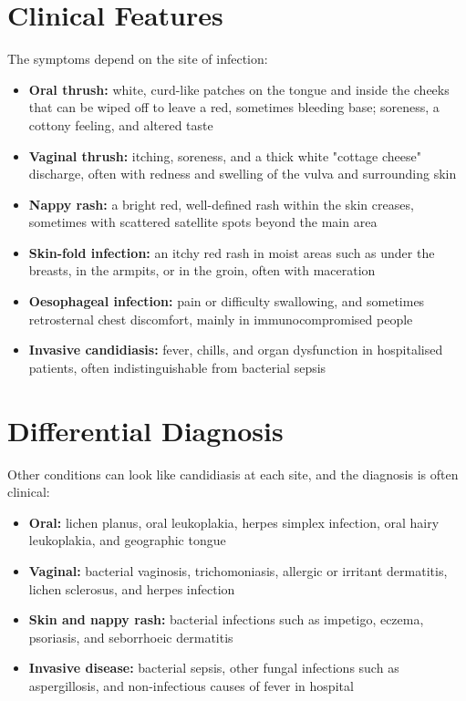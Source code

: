\section*{Clinical Features}
The symptoms depend on the site of infection:
\begin{itemize}
    \item \textbf{Oral thrush:} white, curd-like patches on the tongue and inside the cheeks that can be wiped off to leave a red, sometimes bleeding base; soreness, a cottony feeling, and altered taste
    \item \textbf{Vaginal thrush:} itching, soreness, and a thick white "cottage cheese" discharge, often with redness and swelling of the vulva and surrounding skin
    \item \textbf{Nappy rash:} a bright red, well-defined rash within the skin creases, sometimes with scattered satellite spots beyond the main area
    \item \textbf{Skin-fold infection:} an itchy red rash in moist areas such as under the breasts, in the armpits, or in the groin, often with maceration
    \item \textbf{Oesophageal infection:} pain or difficulty swallowing, and sometimes retrosternal chest discomfort, mainly in immunocompromised people
    \item \textbf{Invasive candidiasis:} fever, chills, and organ dysfunction in hospitalised patients, often indistinguishable from bacterial sepsis
\end{itemize}

\section*{Differential Diagnosis}
Other conditions can look like candidiasis at each site, and the diagnosis is often clinical:
\begin{itemize}
    \item \textbf{Oral:} lichen planus, oral leukoplakia, herpes simplex infection, oral hairy leukoplakia, and geographic tongue
    \item \textbf{Vaginal:} bacterial vaginosis, trichomoniasis, allergic or irritant dermatitis, lichen sclerosus, and herpes infection
    \item \textbf{Skin and nappy rash:} bacterial infections such as impetigo, eczema, psoriasis, and seborrhoeic dermatitis
    \item \textbf{Invasive disease:} bacterial sepsis, other fungal infections such as aspergillosis, and non-infectious causes of fever in hospital
\end{itemize}

